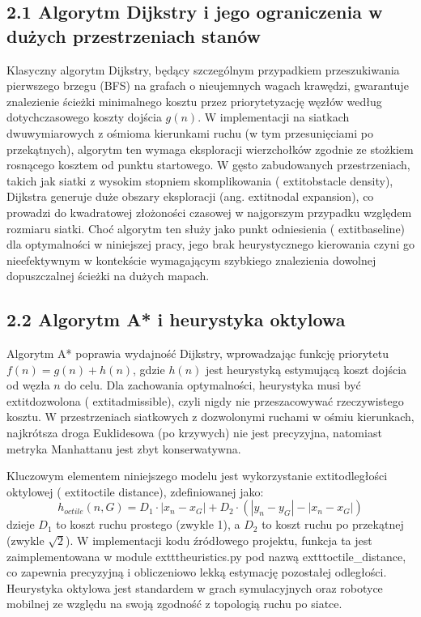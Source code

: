 \documentclass[conference]{IEEEtran}
\begin{document}
\subsection{2.1 Algorytm Dijkstry i jego ograniczenia w dużych przestrzeniach stanów}
Klasyczny algorytm Dijkstry, będący szczególnym przypadkiem przeszukiwania pierwszego brzegu (BFS) na grafach o nieujemnych wagach krawędzi, gwarantuje znalezienie ścieżki minimalnego kosztu przez priorytetyzację węzłów według dotychczasowego koszty dojścia $g(n)$\cite{tang2025routing}. W implementacji na siatkach dwuwymiarowych z ośmioma kierunkami ruchu (w tym przesunięciami po przekątnych), algorytm ten wymaga eksploracji wierzchołków zgodnie ze stożkiem rosnącego kosztem od punktu startowego. W gęsto zabudowanych przestrzeniach, takich jak siatki z wysokim stopniem skomplikowania ( extit{obstacle density}), Dijkstra generuje duże obszary eksploracji (ang.  extit{nodal expansion}), co prowadzi do kwadratowej złożoności czasowej w najgorszym przypadku względem rozmiaru siatki. Choć algorytm ten służy jako punkt odniesienia ( extit{baseline}) dla optymalności w niniejszej pracy, jego brak heurystycznego kierowania czyni go nieefektywnym w kontekście wymagającym szybkiego znalezienia dowolnej dopuszczalnej ścieżki na dużych mapach\cite{ahmadi2024resource}.

\subsection{2.2 Algorytm A* i heurystyka oktylowa}
Algorytm A* poprawia wydajność Dijkstry, wprowadzając funkcję priorytetu $f(n) = g(n) + h(n)$, gdzie $h(n)$ jest heurystyką estymującą koszt dojścia od węzła $n$ do celu. Dla zachowania optymalności, heurystyka musi być  extit{dozwolona} ( extit{admissible}), czyli nigdy nie przeszacowywać rzeczywistego kosztu\cite{casasramos2025declarealign}. W przestrzeniach siatkowych z dozwolonymi ruchami w ośmiu kierunkach, najkrótsza droga Euklidesowa (po krzywych) nie jest precyzyjna, natomiast metryka Manhattanu jest zbyt konserwatywna. 

Kluczowym elementem niniejszego modelu jest wykorzystanie  extit{odległości oktylowej} ( extit{octile distance}), zdefiniowanej jako:
\begin{equation}
    h_{octile}(n, G) = D_1 \cdot |x_n - x_G| + D_2 \cdot (|y_n - y_G| - |x_n - x_G|)
\end{equation}
dzieje $D_1$ to koszt ruchu prostego (zwykle 1), a $D_2$ to koszt ruchu po przekątnej (zwykle $\sqrt{2}$). W implementacji kodu źródłowego projektu, funkcja ta jest zaimplementowana w module  exttt{heuristics.py} pod nazwą  exttt{octile\_distance}, co zapewnia precyzyjną i obliczeniowo lekką estymację pozostałej odległości. Heurystyka oktylowa jest standardem w grach symulacyjnych oraz robotyce mobilnej ze względu na swoją zgodność z topologią ruchu po siatce\cite{wang2026vikpath}.
\end{document}
